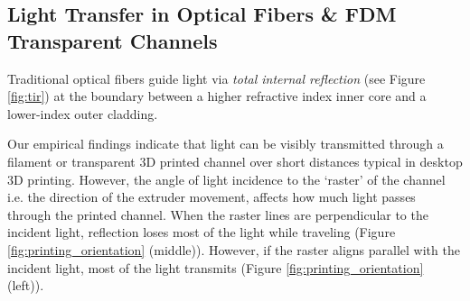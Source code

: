 \subsection{Light Transfer in Optical Fibers \& FDM Transparent Channels}
\label{sec:light_transfer}
Traditional optical fibers guide light via \textit{total internal reflection} (see Figure \ref{fig:tir}) at the boundary between a higher refractive index inner core and a lower-index outer cladding. 




Our empirical findings indicate that light can be visibly transmitted through a filament or transparent 3D printed channel over short distances typical in desktop 3D printing. However, the angle of light incidence to the `raster' of the channel i.e. the direction of the extruder movement, affects how much light passes through the printed channel. When the raster lines are perpendicular to the incident light, reflection loses most of the light while traveling (Figure \ref{fig:printing_orientation} (middle)). However, if the raster aligns parallel with the incident light, most of the light transmits (Figure \ref{fig:printing_orientation} (left)).


